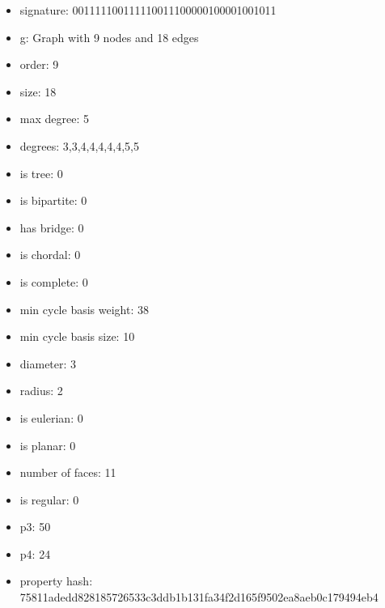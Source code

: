 \newpage
\begin{figure}
\end{figure}
\begin{itemize}
\item signature: 001111100111110011100000100001001011
\item g: Graph with 9 nodes and 18 edges
\item order: 9
\item size: 18
\item max degree: 5
\item degrees: 3,3,4,4,4,4,4,5,5
\item is tree: 0
\item is bipartite: 0
\item has bridge: 0
\item is chordal: 0
\item is complete: 0
\item min cycle basis weight: 38
\item min cycle basis size: 10
\item diameter: 3
\item radius: 2
\item is eulerian: 0
\item is planar: 0
\item number of faces: 11
\item is regular: 0
\item p3: 50
\item p4: 24
\item property hash: 75811adedd828185726533c3ddb1b131fa34f2d165f9502ea8aeb0c179494eb4
\end{itemize}
